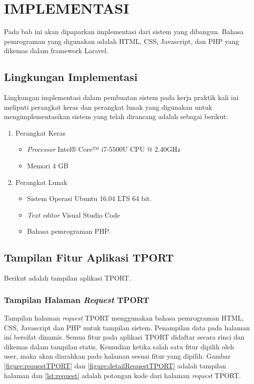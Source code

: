 \chapter{IMPLEMENTASI}
Pada bab ini akan dipaparkan implementasi dari sistem yang dibangun. Bahasa pemrograman yang digunakan adalah HTML, CSS, Javascript, dan PHP yang dikemas dalam framework Laravel.

\section{Lingkungan Implementasi}
\tab Lingkungan implementasi dalam pembuatan sistem pada kerja praktik kali ini meliputi perangkat keras dan perangkat lunak yang digunakan untuk mengimplementasikan sistem yang telah dirancang adalah sebagai berikut:
\begin{enumerate}
	\item Perangkat Keras
	\begin{itemize}
	\item \textit{Processor} Intel® Core™ i7-5500U CPU @ 2.40GHz
	\item Memori 4 GB
	\end{itemize}
	\item Perangkat Lunak
	\begin{itemize}
	\item Sistem Operasi Ubuntu 16.04 LTS 64 bit.
	\item \textit{Text editor} Visual Studio Code
	\item Bahasa pemrograman PHP.
	\end{itemize}
\end{enumerate}

\section{Tampilan Fitur Aplikasi TPORT}
Berikut adalah tampilan aplikasi TPORT.

\subsection{Tampilan Halaman \textit{Request} TPORT}
Tampilan halaman \textit{request} TPORT menggunakan bahasa pemrograman HTML, CSS, Javascript dan PHP untuk tampilan sistem. Penampilan data pada halaman ini bersifat dinamis. Semua fitur pada aplikasi TPORT didaftar secara rinci dan dikemas dalam tampilan statis. Kemudian ketika salah satu fitur dipilih oleh user, maka akan diarahkan pada halaman sesuai fitur yang dipilih. Gambar \ref{figure:requestTPORT} dan \ref{figure:detailRequestTPORT} adalah tampilan halaman dan \ref{lst:request} adalah potongan kode dari halaman \textit{request} TPORT.

